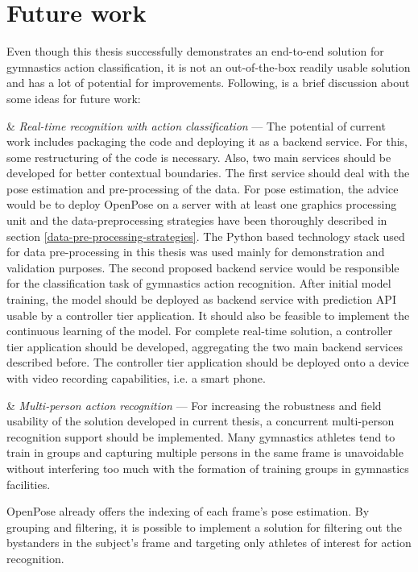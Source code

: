 \section{Future work}

Even though this thesis successfully demonstrates an end-to-end solution for gymnastics action classification, it is not an out-of-the-box readily usable solution and has a lot of potential for improvements. Following, is a brief discussion about some ideas for future work:

\begin{easylist}[enumerate]

& \textit{Real-time recognition with action classification} --- The potential of current work includes packaging the code and deploying it as a backend service. For this, some restructuring of the code is necessary. Also, two main services should be developed for better contextual boundaries. The first service should deal with the pose estimation and pre-processing of the data. For pose estimation, the advice would be to deploy OpenPose on a server with at least one graphics processing unit and the data-preprocessing strategies have been thoroughly described in section \ref{data-pre-processing-strategies}. The Python based technology stack used for data pre-processing in this thesis was used mainly for demonstration and validation purposes. The second proposed backend service would be responsible for the classification task of gymnastics action recognition. After initial model training, the model should be deployed as backend service with prediction API usable by a controller tier application. It should also be feasible to implement the continuous learning of the model. For complete real-time solution, a controller tier application should be developed, aggregating the two main backend services described before. The controller tier application should be deployed onto a device with video recording capabilities, i.e. a smart phone.

& \textit{Multi-person action recognition} --- For increasing the robustness and field usability of the solution developed in current thesis, a concurrent multi-person recognition support should be implemented. Many gymnastics athletes tend to train in groups and capturing multiple persons in the same frame is unavoidable without interfering too much with the formation of training groups in gymnastics facilities. 

OpenPose already offers the indexing of each frame's pose estimation. By grouping and filtering, it is possible to implement a solution for filtering out the bystanders in the subject's frame and targeting only athletes of interest for action recognition.
    
\end{easylist}


